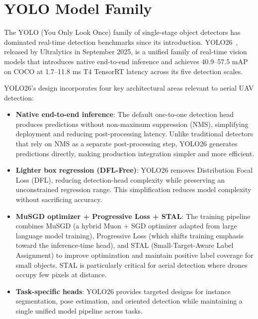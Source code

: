 \documentclass[12pt,a4paper]{report}
\begin{document}
\section{YOLO Model Family}

The YOLO (You Only Look Once) family of single-stage object detectors has
dominated real-time detection benchmarks since its introduction. YOLO26~\cite{ultralytics2025},
released by Ultralytics in September 2025, is a unified family of real-time
vision models that introduces native end-to-end inference and achieves
40.9--57.5 mAP on COCO at 1.7--11.8 ms T4 TensorRT latency across its five
detection scales.

YOLO26's design incorporates four key architectural areas relevant to aerial
UAV detection:

\begin{itemize}
  \item \textbf{Native end-to-end inference}: The default one-to-one detection
        head produces predictions without non-maximum suppression (NMS),
        simplifying deployment and reducing post-processing latency. Unlike
        traditional detectors that rely on NMS as a separate post-processing
        step, YOLO26 generates predictions directly, making production
        integration simpler and more efficient.
  
  \item \textbf{Lighter box regression (DFL-Free)}: YOLO26 removes Distribution
        Focal Loss (DFL), reducing detection-head complexity while preserving
        an unconstrained regression range. This simplification reduces model
        complexity without sacrificing accuracy.
  
  \item \textbf{MuSGD optimizer + Progressive Loss + STAL}: The training pipeline
        combines MuSGD (a hybrid Muon + SGD optimizer adapted from large language
        model training), Progressive Loss (which shifts training emphasis toward
        the inference-time head), and STAL (Small-Target-Aware Label Assignment)
        to improve optimization and maintain positive label coverage for small
        objects. STAL is particularly critical for aerial detection where drones
        occupy few pixels at distance.
  
  \item \textbf{Task-specific heads}: YOLO26 provides targeted designs for
        instance segmentation, pose estimation, and oriented detection while
        maintaining a single unified model pipeline across tasks.
\end{itemize}
\end{document}
